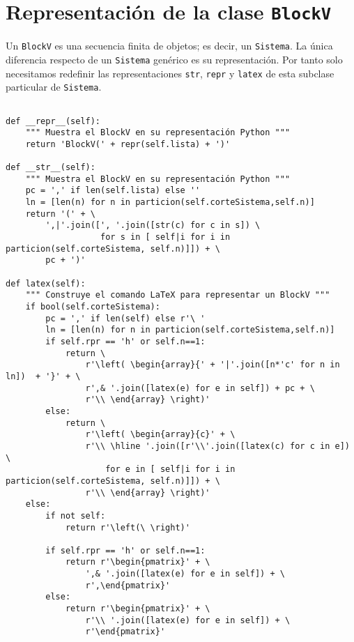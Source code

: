 \documentclass[11pt]{report}
\begin{document}
\section{Representación de la clase \texttt{BlockV}}
\label{sec:org24783cb}
Un \texttt{BlockV} es una secuencia finita de objetos; es decir, un
\texttt{Sistema}.  La única diferencia respecto de un \texttt{Sistema} genérico es
su representación. Por tanto solo necesitamos redefinir las
representaciones \texttt{str}, \texttt{repr} y \texttt{latex} de esta subclase particular
de \texttt{Sistema}.


\begin{verbatim}

def __repr__(self):
    """ Muestra el BlockV en su representación Python """
    return 'BlockV(' + repr(self.lista) + ')'
                           
def __str__(self):
    """ Muestra el BlockV en su representación Python """
    pc = ',' if len(self.lista) else ''
    ln = [len(n) for n in particion(self.corteSistema,self.n)]
    return '(' + \
        ',|'.join([', '.join([str(c) for c in s]) \
                   for s in [ self|i for i in particion(self.corteSistema, self.n)]]) + \
        pc + ')'

def latex(self):
    """ Construye el comando LaTeX para representar un BlockV """
    if bool(self.corteSistema):
        pc = ',' if len(self) else r'\ '
        ln = [len(n) for n in particion(self.corteSistema,self.n)]
        if self.rpr == 'h' or self.n==1:    
            return \
                r'\left( \begin{array}{' + '|'.join([n*'c' for n in ln])  + '}' + \
                r',& '.join([latex(e) for e in self]) + pc + \
                r'\\ \end{array} \right)'
        else:
            return \
                r'\left( \begin{array}{c}' + \
                r'\\ \hline '.join([r'\\'.join([latex(c) for c in e]) \
                    for e in [ self|i for i in particion(self.corteSistema, self.n)]]) + \
                r'\\ \end{array} \right)'
    else:
        if not self:
            return r'\left(\ \right)'

        if self.rpr == 'h' or self.n==1:
            return r'\begin{pmatrix}' + \
                ',& '.join([latex(e) for e in self]) + \
                r',\end{pmatrix}'
        else:
            return r'\begin{pmatrix}' + \
                r'\\ '.join([latex(e) for e in self]) + \
                r'\end{pmatrix}'

\end{verbatim}
\end{document}
